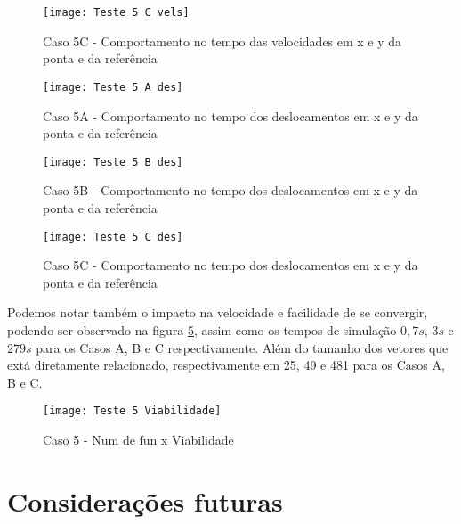 \begin{figure}[!htb]
    \begin{center}
    \caption{Caso 5C - Comportamento no tempo das velocidades em x e y da ponta e da referência}
    \texttt{[image: Teste 5 C vels]}
    \label{fig:t_5c_vels}
    \end{center}
\end{figure}

\begin{figure}[!htb]
    \begin{center}
    \caption{Caso 5A - Comportamento no tempo dos deslocamentos em x e y da ponta e da referência}
    \texttt{[image: Teste 5 A des]}
    \label{fig:t_5a_des}
    \end{center}
\end{figure}

\begin{figure}[!htb]
    \begin{center}
    \caption{Caso 5B - Comportamento no tempo dos deslocamentos em x e y da ponta e da referência}
    \texttt{[image: Teste 5 B des]}
    \label{fig:t_5b_des}
    \end{center}
\end{figure}

\begin{figure}[!htb]
    \begin{center}
    \caption{Caso 5C - Comportamento no tempo dos deslocamentos em x e y da ponta e da referência}
    \texttt{[image: Teste 5 C des]}
    \label{fig:t_5c_des}
    \end{center}
\end{figure}

Podemos notar também o impacto na velocidade e facilidade de se convergir, podendo ser observado na figura \ref{fig:t_5_viab}, assim
como os tempos de simulação $0,7 s$, $3 s$ e $279 s$ para os Casos A, B e C respectivamente. Além do tamanho dos vetores que extá diretamente relacionado,
respectivamente em 25, 49 e 481 para os Casos A, B e C.

\begin{figure}[!htb]
    \begin{center}
    \caption{Caso 5 - Num de fun x Viabilidade}
    \texttt{[image: Teste 5 Viabilidade]}
    \label{fig:t_5_viab}
    \end{center}
\end{figure}

\section{Considerações futuras}
